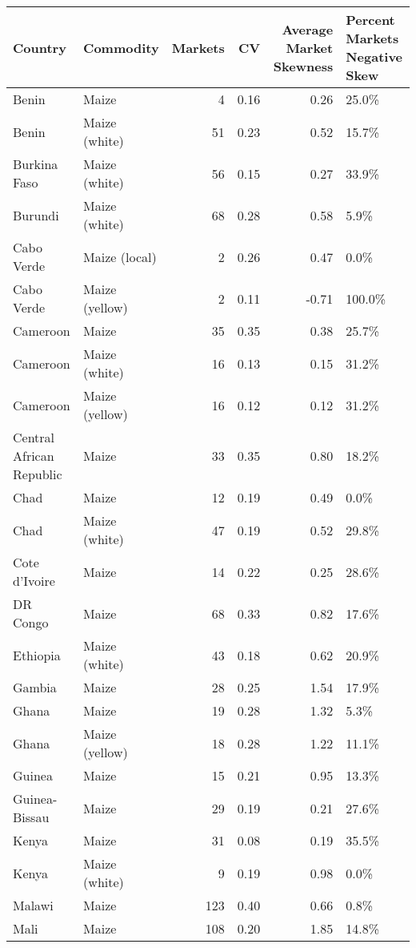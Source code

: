 \begin{table}[ht]
\centering
\begin{tabular}{llrrrl}
  \hline
Country & Commodity & Markets & CV & Average Market Skewness  & Percent Markets Negative Skew \\ 
  \hline
Benin & Maize &   4 & 0.16 & 0.26 & 25.0\% \\ 
  Benin & Maize (white) &  51 & 0.23 & 0.52 & 15.7\% \\ 
  Burkina Faso & Maize (white) &  56 & 0.15 & 0.27 & 33.9\% \\ 
  Burundi & Maize (white) &  68 & 0.28 & 0.58 & 5.9\% \\ 
  Cabo Verde & Maize (local) &   2 & 0.26 & 0.47 & 0.0\% \\ 
  Cabo Verde & Maize (yellow) &   2 & 0.11 & -0.71 & 100.0\% \\ 
  Cameroon & Maize &  35 & 0.35 & 0.38 & 25.7\% \\ 
  Cameroon & Maize (white) &  16 & 0.13 & 0.15 & 31.2\% \\ 
  Cameroon & Maize (yellow) &  16 & 0.12 & 0.12 & 31.2\% \\ 
  Central African Republic & Maize &  33 & 0.35 & 0.80 & 18.2\% \\ 
  Chad & Maize &  12 & 0.19 & 0.49 & 0.0\% \\ 
  Chad & Maize (white) &  47 & 0.19 & 0.52 & 29.8\% \\ 
  Cote d'Ivoire & Maize &  14 & 0.22 & 0.25 & 28.6\% \\ 
  DR Congo & Maize &  68 & 0.33 & 0.82 & 17.6\% \\ 
  Ethiopia & Maize (white) &  43 & 0.18 & 0.62 & 20.9\% \\ 
  Gambia & Maize &  28 & 0.25 & 1.54 & 17.9\% \\ 
  Ghana & Maize &  19 & 0.28 & 1.32 & 5.3\% \\ 
  Ghana & Maize (yellow) &  18 & 0.28 & 1.22 & 11.1\% \\ 
  Guinea & Maize &  15 & 0.21 & 0.95 & 13.3\% \\ 
  Guinea-Bissau & Maize &  29 & 0.19 & 0.21 & 27.6\% \\ 
  Kenya & Maize &  31 & 0.08 & 0.19 & 35.5\% \\ 
  Kenya & Maize (white) &   9 & 0.19 & 0.98 & 0.0\% \\ 
  Malawi & Maize & 123 & 0.40 & 0.66 & 0.8\% \\ 
  Mali & Maize & 108 & 0.20 & 1.85 & 14.8\% \\ 

\end{tabular}
\end{table}
